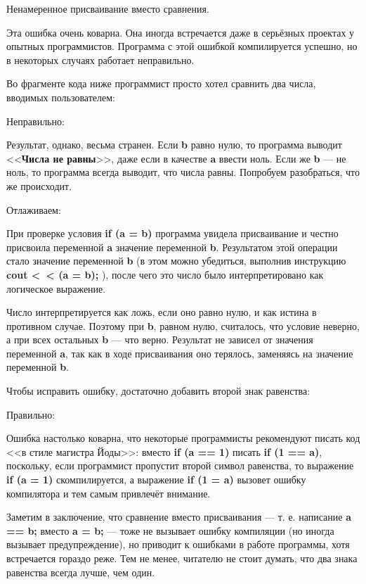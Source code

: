 \begin{typerror}
	\label{TE_assignment-instead-of-comparison}
	Ненамеренное присваивание вместо сравнения.

	Эта ошибка очень коварна.
	Она иногда встречается даже в серьёзных проектах у опытных программистов.
	Программа с этой ошибкой компилируется успешно, но в некоторых случаях работает неправильно.

	Во фрагменте кода ниже программист просто хотел сравнить два числа, вводимых пользователем:

	Неправильно:

	Результат, однако, весьма странен.
	Если \textbf{b} равно нулю, то программа выводит <<\textbf{Числа не равны}>>, даже если в качестве \textbf{a} ввести ноль.
	Если же \textbf{b} --- не ноль, то программа всегда выводит, что числа равны.
	Попробуем разобраться, что же происходит.

	Отлаживаем:

	При проверке условия \textbf{if (a = b)} программа увидела присваивание
	и честно присвоила переменной \textbf{a} значение переменной \textbf{b}.
	Результатом этой операции стало значение переменной \textbf{b}
	(в этом можно убедиться, выполнив инструкцию \textbf{cout <~\!\!\!< (a = b);} ),
	после чего это число было интерпретировано как логическое выражение.

	Число интерпретируется как ложь, если оно равно нулю, и как истина в противном случае.
	Поэтому при \textbf{b}, равном нулю, считалось, что условие неверно,
	а при всех остальных \textbf{b} --- что верно.
	Результат не зависел от значения переменной \textbf{a},
	так как в ходе присваивания оно терялось, заменяясь на значение переменной \textbf{b}.

	Чтобы исправить ошибку, достаточно добавить второй знак равенства:

	Правильно:

	Ошибка настолько коварна, что некоторые программисты рекомендуют писать код <<в стиле магистра Йоды>>:
	вместо \textbf{if (a == 1)} писать \textbf{if (1 == a)},
	поскольку, если программист пропустит второй символ равенства,
	то  выражение \textbf{if (a = 1)} скомпилируется, а выражение \textbf{if (1 = a)} вызовет ошибку компилятора и тем самым привлечёт внимание.

	Заметим в заключение, что сравнение вместо присваивания --- т. е. написание \textbf{a == b;} вместо \textbf{a = b;} 
	--- тоже не вызывает ошибку компиляции (но иногда вызывает предупреждение), но приводит к ошибками в работе программы,
	хотя встречается гораздо реже.
	Тем не менее, читателю не стоит думать, что два знака равенства всегда лучше, чем один.

\end{typerror}
